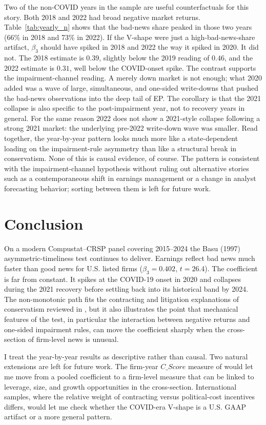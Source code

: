 \documentclass[12pt]{article}
\begin{document}
Two of the non-COVID years in the sample are useful counterfactuals for this story. Both 2018 and 2022 had broad negative market returns. Table~\ref{tab:yearly_n} shows that the bad-news share peaked in those two years (66\% in 2018 and 73\% in 2022). If the V-shape were just a high-bad-news-share artifact, $\beta_3$ should have spiked in 2018 and 2022 the way it spiked in 2020. It did not. The 2018 estimate is $0.39$, slightly below the 2019 reading of $0.46$, and the 2022 estimate is $0.31$, well below the COVID-onset spike. The contrast supports the impairment-channel reading. A merely down market is not enough; what 2020 added was a wave of large, simultaneous, and one-sided write-downs that pushed the bad-news observations into the deep tail of EP. The corollary is that the 2021 collapse is also specific to the post-impairment year, not to recovery years in general. For the same reason 2022 does not show a 2021-style collapse following a strong 2021 market: the underlying pre-2022 write-down wave was smaller. Read together, the year-by-year pattern looks much more like a state-dependent loading on the impairment-rule asymmetry than like a structural break in conservatism. None of this is causal evidence, of course. The pattern is consistent with the impairment-channel hypothesis without ruling out alternative stories such as a contemporaneous shift in earnings management or a change in analyst forecasting behavior; sorting between them is left for future work.

\section{Conclusion}
\label{sec:conclusion}
On a modern Compustat--CRSP panel covering 2015--2024 the Basu (1997) asymmetric-timeliness test continues to deliver. Earnings reflect bad news much faster than good news for U.S. listed firms ($\beta_{3} = 0.402$, $t=26.4$). The coefficient is far from constant. It spikes at the COVID-19 onset in 2020 and collapses during the 2021 recovery before settling back into its historical band by 2024. The non-monotonic path fits the contracting and litigation explanations of conservatism reviewed in \citet{watts2003a}, but it also illustrates the \citet{dietrich2007} point that mechanical features of the test, in particular the interaction between negative returns and one-sided impairment rules, can move the coefficient sharply when the cross-section of firm-level news is unusual.

I treat the year-by-year results as descriptive rather than causal. Two natural extensions are left for future work. The firm-year $\mathit{C\_Score}$ measure of \citet{khan2009} would let me move from a pooled coefficient to a firm-level measure that can be linked to leverage, size, and growth opportunities in the cross-section. International samples, where the relative weight of contracting versus political-cost incentives differs, would let me check whether the COVID-era V-shape is a U.S. GAAP artifact or a more general pattern.
\end{document}
